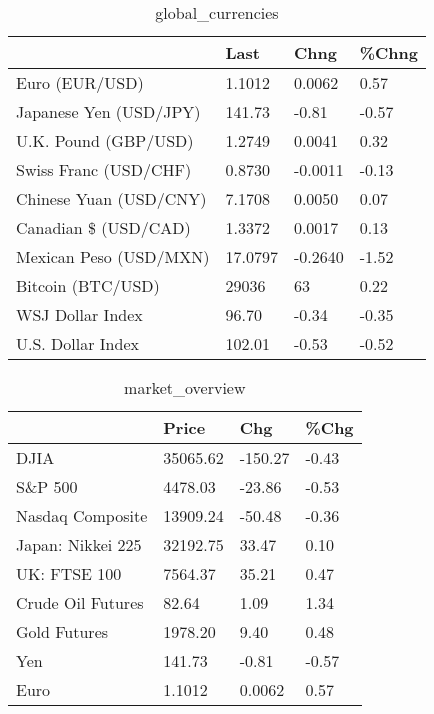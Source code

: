 \documentclass{article}%
\begin{document}
%


\begin{table}[htbp]%
\caption{global\_currencies}%
\centering%
\begin{adjustbox}{width=1\textwidth}%
\begin{tabular}{llll}
\toprule
                       &    Last &    Chng & \%Chng \\
\midrule
        Euro (EUR/USD) &  1.1012 &  0.0062 &  0.57 \\
Japanese Yen (USD/JPY) &  141.73 &   -0.81 & -0.57 \\
  U.K. Pound (GBP/USD) &  1.2749 &  0.0041 &  0.32 \\
 Swiss Franc (USD/CHF) &  0.8730 & -0.0011 & -0.13 \\
Chinese Yuan (USD/CNY) &  7.1708 &  0.0050 &  0.07 \\
  Canadian \$ (USD/CAD) &  1.3372 &  0.0017 &  0.13 \\
Mexican Peso (USD/MXN) & 17.0797 & -0.2640 & -1.52 \\
     Bitcoin (BTC/USD) &   29036 &      63 &  0.22 \\
      WSJ Dollar Index &   96.70 &   -0.34 & -0.35 \\
     U.S. Dollar Index &  102.01 &   -0.53 & -0.52 \\
\bottomrule
\end{tabular}
%
\end{adjustbox}%
\end{table}

%


\begin{table}[htbp]%
\caption{market\_overview}%
\centering%
\begin{adjustbox}{width=1\textwidth}%
\begin{tabular}{llll}
\toprule
                  &    Price &     Chg &  \%Chg \\
\midrule
             DJIA & 35065.62 & -150.27 & -0.43 \\
          S\&P 500 &  4478.03 &  -23.86 & -0.53 \\
 Nasdaq Composite & 13909.24 &  -50.48 & -0.36 \\
Japan: Nikkei 225 & 32192.75 &   33.47 &  0.10 \\
     UK: FTSE 100 &  7564.37 &   35.21 &  0.47 \\
Crude Oil Futures &    82.64 &    1.09 &  1.34 \\
     Gold Futures &  1978.20 &    9.40 &  0.48 \\
              Yen &   141.73 &   -0.81 & -0.57 \\
             Euro &   1.1012 &  0.0062 &  0.57 \\
\bottomrule
\end{tabular}
%
\end{adjustbox}%
\end{table}

%
\end{document}
